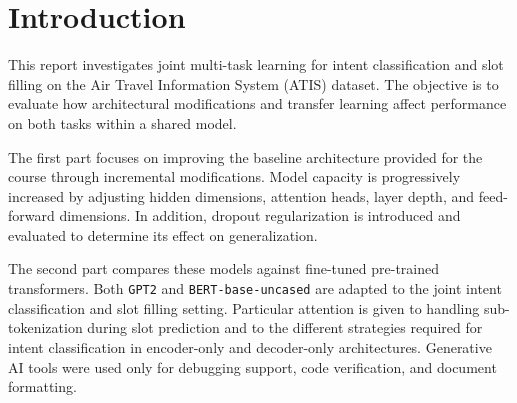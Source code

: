 \section{Introduction}
\label{sec:introduction_2}

This report investigates joint multi-task learning for intent classification and slot filling on the Air Travel Information System (ATIS) dataset. The objective is to evaluate how architectural modifications and transfer learning affect performance on both tasks within a shared model.

The first part focuses on improving the baseline architecture provided for the course through incremental modifications. Model capacity is progressively increased by adjusting hidden dimensions, attention heads, layer depth, and feed-forward dimensions. In addition, dropout regularization is introduced and evaluated to determine its effect on generalization.

The second part compares these models against fine-tuned pre-trained transformers. Both \texttt{GPT2} and \texttt{BERT-base-uncased} are adapted to the joint intent classification and slot filling setting. Particular attention is given to handling sub-tokenization during slot prediction and to the different strategies required for intent classification in encoder-only and decoder-only architectures. Generative AI tools were used only for debugging support, code verification, and document formatting.
